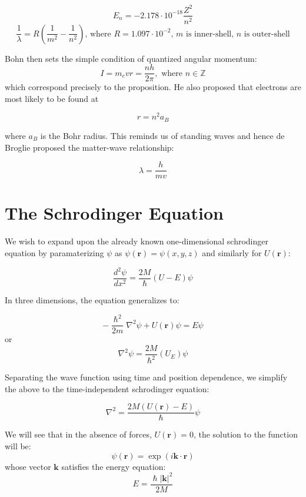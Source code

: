 \documentclass[11pt,fleqn]{book} %
\begin{document}
\begin{descriptions}
\begin{itemize}
    \end{itemize}
    \begin{proposition}
        $$E_n=-2.178\cdot10^{-18}\frac{Z^2}{n^2}$$
        $$\frac{1}{\lambda}=R\left(\frac{1}{m^2}-\frac{1}{n^2}\right)\text{, where 
 }R=1.097\cdot10^{-2}\text{, $m$ is inner-shell, $n$ is outer-shell}$$
    \end{proposition}
    Bohn then sets the simple condition of quantized angular momentum:
    \[
    I=m_evr=\frac{nh}{2\pi},\text{ where }n\in \mathbb{Z}
    \]
    which correspond precisely to the proposition. He also proposed that electrons are most likely to be found at 
    \begin{proposition}
        $$r=n^2a_B$$
    \end{proposition}
    where $a_B$ is the Bohr radius. This reminds us of standing waves and hence de Broglie proposed the matter-wave relationship:
    \begin{theorem}
        $$\lambda=\frac{h}{mv}$$
    \end{theorem}
\end{descriptions}

\section{The Schrodinger Equation}
We wish to expand upon the already known one-dimensional schrodinger equation by paramaterizing $\psi$ as $\psi(\mathbf{r})=\psi(x,y,z)$ and similarly for $U(\mathbf{r})$:
\begin{theorem}
    $$\frac{d^2\psi}{dx^2}=\frac{2M}{\hslash}(U-E)\psi$$
\end{theorem}
In three dimensions, the equation generalizes to:
\begin{theorem}
    $$-\frac{\hslash^2}{2m} \nabla^2 \psi + U(\mathbf{r}) \psi = E \psi$$
    or
    $$\nabla^2\psi=\frac{2M}{\hslash^2}(U_E)\psi$$
\end{theorem}
Separating the wave function using time and position dependence, we simplify the above to the time-independent schrodinger equation:
\begin{theorem}
    $$\nabla^2=\frac{2M(U(\mathbf{r})-E)}{\hslash}\psi$$
\end{theorem}
We will see that in the absence of forces, $U(\mathbf{r})=0$, the solution to the function will be:
$$\psi(\mathbf{r})=\exp(i\mathbf{k}\cdot\mathbf{r})$$
whose vector $\mathbf{k}$ satisfies the energy equation: 
$$E=\frac{\hslash|\mathbf{k}|^2}{2M}$$
\end{document}
